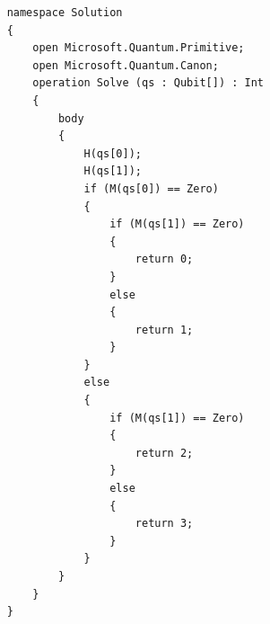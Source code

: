 \documentclass[12pt]{article}
\begin{document}
	\begin{lstlisting}
	namespace Solution
	{
	    open Microsoft.Quantum.Primitive;
	    open Microsoft.Quantum.Canon;
	    operation Solve (qs : Qubit[]) : Int 
	    {
	        body 
	        {
	            H(qs[0]);
	            H(qs[1]);
	            if (M(qs[0]) == Zero) 
	            {
	                if (M(qs[1]) == Zero) 
	                {
	                    return 0;
	                }
	                else 
	                {
	                    return 1;
	                }
	            }
	            else 
	            {
	                if (M(qs[1]) == Zero) 
	                {
	                    return 2;
	                }
	                else 
	                {
	                    return 3;
	                }
	            }
	        }
	    }
	}
\end{lstlisting}
\end{document}
